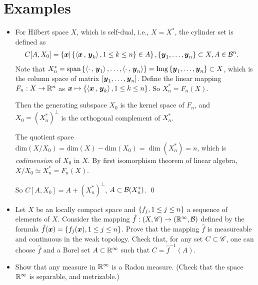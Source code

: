 \documentclass[11pt]{article}
\begin{document}
\section{Examples}
\begin{itemize}
\item 
\begin{example}
For Hilbert space $X$, which is self-dual, i.e., $X = X^{*}$, the cylinder set is defined as 
\begin{align*}
C[A, X_{0}] &= \left\{\boldsymbol{x}|  \left\{\left\langle \boldsymbol{x}\,,\, \boldsymbol{y}_{k} \right\rangle, 1\le k\le n\right\}\in A \right\}, \left\{\boldsymbol{y}_{1}, \ldots, \boldsymbol{y}_{n}\right\} \subset X, A\in {\mathcal B}^{n}.
\end{align*} 
Note that $X_{n}^{*}= \text{span}\left\{\left\langle \cdot\,,\, \boldsymbol{y}_{1} \right\rangle, \ldots, \left\langle \cdot\,,\, \boldsymbol{y}_{n} \right\rangle \right\} = \text{Img}\left\{ \boldsymbol{y}_{1}, \ldots,\boldsymbol{y}_{n}\right\}  \subset X$, which is the column space of matrix $[\boldsymbol{y}_{1}, \ldots,\boldsymbol{y}_{n}]$. Define the linear mapping $F_{n}: X\rightarrow {\mathbb R}^{n}$ as $\boldsymbol{x} \mapsto \left\{\left\langle \boldsymbol{x}\,,\, \boldsymbol{y}_{k} \right\rangle, 1\le k\le n\right\}$. So $X_{n}^{*}= F_{n}(X)$. 

Then the generating subspace $X_{0}$ is the kernel space of $F_{n}$, and $X_{0} =(X_{n}^{*})^{\bot} $ is the orthogonal complement of $X_{n}^{*}$. 

The quotient space $\text{dim}(X/X_{0}) = \text{dim}(X) - \text{dim}(X_{0}) = \dim(X_{n}^{*}) = n$, which is \emph{codimension} of $X_{0}$ in $X$. By  first isomorphism theorem of linear algebra, $X/X_{0}\simeq X_{n}^{*}=F_{n}(X)$. 

So $C[A, X_{0}] = A + (X_{n}^{*})^{\bot} $, $A \subset {\mathcal B}(X_{n}^{*})$. \qed
\end{example}\vspace{15pt}

\item \begin{example}
Let $X$ be an locally compact space and $\left\{f_{j}, 1\le j\le n\right\}$ a sequence of elements of $X$. Consider the mapping 
$\hat{f}: (X, {\mathscr C}) \rightarrow ({\mathbb R}^{\infty}, {\mathcal B})$ defined by the formula $\hat{f}(\boldsymbol{x}) = \left\{f_{j}(\boldsymbol{x}), 1\le j\le n\right\}$. Prove that the mapping $\hat{f}$ is measureable and continuous in the weak topology. Check that, for any set $C\subset {\mathscr C}$,  one can choose $\hat{f}$ and a Borel set $A\subset {\mathbb R}^{\infty}$ such that $C = \hat{f}^{-1}(A)$.
\end{example}

\item \begin{example}
Show that any measure in ${\mathbb R}^{\infty}$ is a Radon measure. (Check that the space ${\mathbb R}^{\infty}$ is separable, and metrizable.)
\end{example}



\end{itemize}
\end{document}
